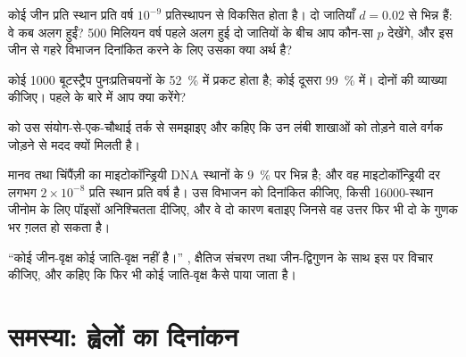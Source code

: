 \begin{exercise}[$\star\star$]\label{exo:b2:phylogenetic-trees:8}
कोई जीन प्रति स्थान प्रति वर्ष $10^{-9}$ प्रतिस्थापन से विकसित होता है। दो
जातियाँ $d = 0.02$ से भिन्न हैं: वे कब अलग हुईं? 500 मिलियन वर्ष पहले
अलग हुई दो जातियों के बीच आप कौन-सा $p$ देखेंगे,
और इस जीन से गहरे विभाजन दिनांकित करने के लिए उसका क्या अर्थ है?
\end{exercise}

\begin{exercise}[$\star\star$]\label{exo:b2:phylogenetic-trees:9}
कोई  \num{1000} बूटस्ट्रैप पुनःप्रतिचयनों के \qty{52}{\%} में प्रकट होता है;
कोई दूसरा \qty{99}{\%} में। दोनों की व्याख्या कीजिए। पहले के बारे में
आप क्या करेंगे?
\end{exercise}

\begin{exercise}[$\star\star\star$]\label{exo:b2:phylogenetic-trees:10}
 को उस संयोग-से-एक-चौथाई तर्क से समझाइए
और कहिए कि उन लंबी शाखाओं को तोड़ने वाले वर्गक जोड़ने से मदद क्यों मिलती है।
\end{exercise}

\begin{exercise}[$\star\star\star$]\label{exo:b2:phylogenetic-trees:11}
मानव तथा चिंपैंज़ी का माइटोकॉन्ड्रियी DNA स्थानों के \qty{9}{\%} पर
भिन्न है; और वह माइटोकॉन्ड्रियी दर लगभग $2\times 10^{-8}$ प्रति स्थान
प्रति वर्ष है। उस विभाजन को दिनांकित कीजिए, किसी \qty{16000}{}-स्थान
जीनोम के लिए पॉइसों अनिश्चितता दीजिए, और वे दो कारण बताइए जिनसे वह उत्तर
फिर भी दो के गुणक भर ग़लत हो सकता है।
\end{exercise}

\begin{exercise}[$\star\star\star$]\label{exo:b2:phylogenetic-trees:12}
``कोई जीन-वृक्ष कोई जाति-वृक्ष नहीं है।'' , क्षैतिज संचरण तथा जीन-द्विगुणन के साथ इस पर विचार कीजिए, और कहिए
कि फिर भी कोई जाति-वृक्ष कैसे पाया जाता है।
\end{exercise}

\section{समस्या: ह्वेलों का दिनांकन}

